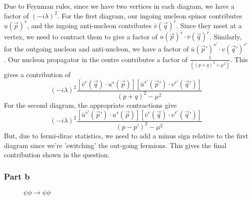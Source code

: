 Due to Feynman rules, since we have two vertices 
in each diagram, we have a factor of $ ( - i \lambda  ) ^  2 $. 
For the first diagram, 
our ingoing nucleon spinor contributes $ u\left( \vec{p} \right)^s $, 
and the ingoing anti-nucleon contributes $ \overline{v }\left(  \vec{q} \right)^ r $. 
Since they meet at a vertex, we need to contract them to give 
a factor of $ u \left( \vec{p}  \right)  ^ s \cdot  \overline{ v } \left( 
\vec{q} \right)  ^ r $. Similarly, for the outgoing nucleon and anti-nucleon, 
we have a factor of 
$\overline{ u } \left( \vec{p} '   \right) ^{ s '  }  \cdot  
v \left( \vec{q} '  \right)  ^{ r ' }  $. 
Our nucleon propagator in the centre contributes a factor of 
$ \frac{1}{\left( \left(  p + q  \right)^ 2   + \mu ^ 2  \right) }$. 
This gives a contribution of 
\[
\left(  - i \lambda  \right)  ^ 2 \frac{
\left[  \overline{ v } ^ r \left( \vec{q}  \right) \cdot  u ^{ s } \left( \vec{p}  \right)   \right]  \left[  \overline{ u }^{ s ' } \left( \vec{p} '  \right) \cdot  v ^{ r '  } \left( \vec{q} '  \right)    \right]  }{ \left(  p + q  \right)  ^  2 - \mu ^ 2  }
\] 
For the second diagram, the appropriate contractions 
give
\[
\left(  - i \lambda  \right)  ^ 2 
\frac{ \left[  \overline{ u } ^{ s ' } \left( \vec{p} '   \right) 
\cdot  u ^{ s } \left( \vec{p}  \right)  \right]  \left[  
\overline{v } ^{ r } \left( \vec{q}  \right)  \cdot  v ^{ r  ' } 
\left( \vec{q} '  \right)  \right]  }{ \left(   p -  p '  \right)  ^ 2 
- \mu ^ 2 }
\] But, due to fermi-dirac statistics, we need to 
add a minus sign relative to the first diagram since we're 
'switching' the out-going fermions. This 
gives the final contribution shown in the question. 

\subsubsection*{Part b}

\begin{figure}[htpb]
\centering

\caption{$\psi \phi \to \psi \phi $}%
\label{fig:e4_q1}
\end{figure}

